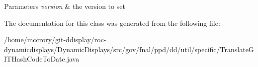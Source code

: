 \begin{DoxyParams}{Parameters}
{\em version} & the version to set \\
\hline
\end{DoxyParams}


The documentation for this class was generated from the following file\-:\begin{DoxyCompactItemize}
\item 
/home/mccrory/git-\/ddisplay/roc-\/dynamicdisplays/\-Dynamic\-Displays/src/gov/fnal/ppd/dd/util/specific/Translate\-G\-I\-T\-Hash\-Code\-To\-Date.\-java\end{DoxyCompactItemize}
